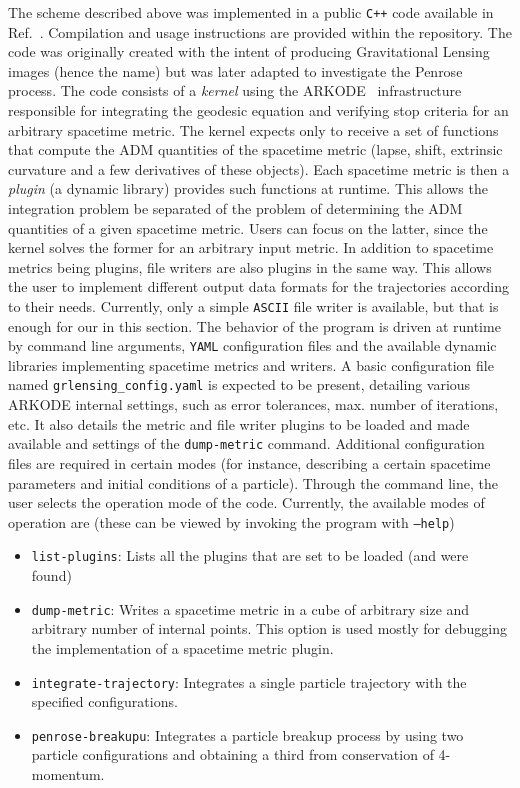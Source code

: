 The scheme described above was implemented in a public \texttt{C++} code available in Ref.~\cite{GRLensingRepo}. Compilation and usage instructions are provided within the repository. The code was originally created with the intent of producing Gravitational Lensing images (hence the name) but was later adapted to investigate the Penrose process. The code consists of a \emph{kernel} using the ARKODE~\cite{ARKODE} infrastructure responsible for integrating the geodesic equation and verifying stop criteria for an arbitrary spacetime metric. The kernel expects only to receive a set of functions that compute the ADM quantities of the spacetime metric (lapse, shift, extrinsic curvature and a few derivatives of these objects). Each spacetime metric is then a \emph{plugin} (a dynamic library) provides such functions at runtime. This allows the integration problem be separated of the problem of determining the ADM quantities of a given spacetime metric. Users can focus on the latter, since the kernel solves the former for an arbitrary input metric. In addition to spacetime metrics being plugins, file writers are also plugins in the same way. This allows the user to implement different output data formats for the trajectories according to their needs. Currently, only a simple \texttt{ASCII} file writer is available, but that is enough for our  in this section. The behavior of the program is driven at runtime by command line arguments, \texttt{YAML} configuration files and the available dynamic libraries implementing spacetime metrics and writers. A basic configuration file named \texttt{grlensing\_config.yaml} is expected to be present, detailing various ARKODE internal settings, such as error tolerances, max. number of iterations, etc. It also details the metric and file writer plugins to be loaded and made available and settings of the \texttt{dump-metric} command. Additional configuration files are required in certain modes (for instance, describing a certain spacetime parameters and initial conditions of a particle). Through the command line, the user selects the operation mode of the code. Currently, the available modes of operation are (these can be viewed by invoking the program with \texttt{--help})
%
\begin{itemize}
  \item \texttt{list-plugins}: Lists all the plugins that are set to be loaded (and were found)
  \item \texttt{dump-metric}: Writes a spacetime metric in a cube of arbitrary size and arbitrary number of internal points. This option is used mostly for debugging the implementation of a spacetime metric plugin.
  \item \texttt{integrate-trajectory}: Integrates a single particle trajectory with the specified configurations.
  \item \texttt{penrose-breakupu}: Integrates a particle breakup process by using two particle configurations and obtaining a third from conservation of 4-momentum.
\end{itemize}
